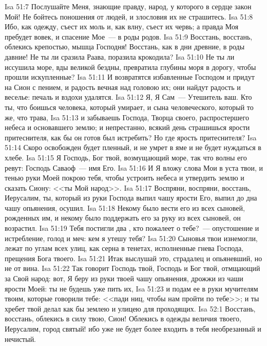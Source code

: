 \vs Isa 51:7 Послушайте Меня, знающие правду, народ, у которого в сердце закон Мой! Не бойтесь поношения от людей, и злословия их не страшитесь.
\vs Isa 51:8 Ибо, как одежду, съест их моль и, как влну, съест их червь; а правда Моя пребудет вовек, и спасение Мое~--- в роды родов.
\vs Isa 51:9 Восстань, восстань, облекись крепостью, мышца Господня! Восстань, как в дни древние, в роды давние! Не ты ли сразила Раава, поразила крокодила?
\vs Isa 51:10 Не ты ли иссушила море, вды великой бездны, превратила глубины моря в дорогу, чтобы прошли искупленные?
\vs Isa 51:11 И возвратятся избавленные Господом и придут на Сион с пением, и радость вечная над головою их; они найдут радость и веселье: печаль и вздохи удалятся.
\vs Isa 51:12 Я, Я Сам~--- Утешитель ваш. Кто ты, что боишься человека, который умирает, и сына человеческого, который то же, что трава,
\vs Isa 51:13 и забываешь Господа, Творца своего, распростершего небеса и основавшего землю; и непрестанно, всякий день страшишься ярости притеснителя, как бы он готов был истребить? Но где ярость притеснителя?
\vs Isa 51:14 Скоро освобожден будет пленный, и не умрет в яме и не будет нуждаться в хлебе.
\vs Isa 51:15 Я Господь, Бог твой, возмущающий море, так что волны его ревут: Господь Саваоф~--- имя Его.
\vs Isa 51:16 И Я вложу слова Мои в уста твои, и тенью руки Моей покрою тебя, чтобы устроить небеса и утвердить землю и сказать Сиону: <<ты Мой народ>>.
\vs Isa 51:17 Воспряни, воспряни, восстань, Иерусалим, ты, который из руки Господа выпил чашу ярости Его, выпил до дна чашу опьянения, осушил.
\vs Isa 51:18 Некому было вести его из всех сыновей, рожденных им, и некому было поддержать его за руку из всех сыновей,  он возрастил.
\vs Isa 51:19 Тебя постигли два , кто пожалеет о тебе?~--- опустошение и истребление, голод и меч: кем я утешу тебя?
\vs Isa 51:20 Сыновья твои изнемогли, лежат по углам всех улиц, как серна в тенетах, исполненные гнева Господа, прещения Бога твоего.
\vs Isa 51:21 Итак выслушай это, страдалец и опьяневший, но не от вина.
\vs Isa 51:22 Так говорит Господь твой, Господь и Бог твой, отмщающий за Свой народ: вот, Я беру из руки твоей чашу опьянения, дрожжи из чаши ярости Моей: ты не будешь уже пить их,
\vs Isa 51:23 и подам ее в руки мучителям твоим, которые говорили тебе: <<пади ниц, чтобы нам пройти по тебе>>; и ты хребет твой делал как бы землею и улицею для проходящих.
\vs Isa 52:1 Восстань, восстань, облекись в силу твою, Сион! Облекись в одежды величия твоего, Иерусалим, город святый! ибо уже не будет более входить в тебя необрезанный и нечистый.
